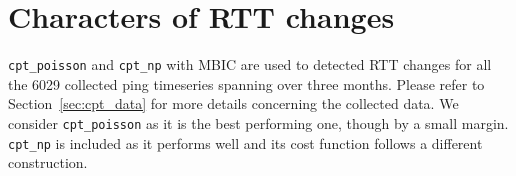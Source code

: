 \section{Characters of RTT changes}
\label{sec:cpt_trace}
\texttt{cpt\_poisson} and \texttt{cpt\_np} with MBIC are used to detected RTT changes for all the 6029 collected ping timeseries spanning over three months.
Please refer to Section~\ref{sec:cpt_data} for more details concerning the collected data.
We consider \texttt{cpt\_poisson} as it is the best performing one, though by a small margin.
\texttt{cpt\_np} is included as it performs well and its cost function follows a different construction.


